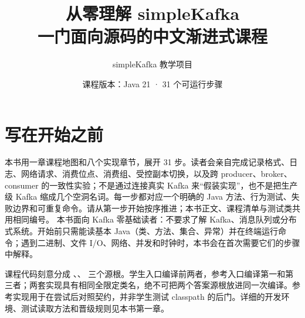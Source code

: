 \title{从零理解 simpleKafka\\\large 一门面向源码的中文渐进式课程}
\author{simpleKafka 教学项目}
\date{课程版本：Java 21 · 31 个可运行步骤}
\hypersetup{pageanchor=false}
\maketitle
\hypersetup{pageanchor=true}
\chapter*{写在开始之前}
本书用一章课程地图和八个实现章节，展开 31 步。读者会亲自完成记录格式、日志、网络请求、消费位点、消费组、受控副本切换，以及跨 producer、broker、consumer 的一致性实验；不是通过连接真实 Kafka 来“假装实现”，也不是把生产级 Kafka 缩成几个空洞名词。每一步都对应一个明确的 Java 方法、行为测试、失败边界和可重复命令。请从第一步开始按序推进；本书正文、课程清单与测试类共用相同编号。
本书面向 Kafka 零基础读者：不要求了解 Kafka、消息队列或分布式系统。开始前只需能读基本 Java（类、方法、集合、异常）并在终端运行命令；遇到二进制、文件 I/O、网络、并发和时钟时，本书会在首次需要它们的步骤中解释。

课程代码刻意分成 、、 三个源根。学生入口编译前两者，参考入口编译第一和第三者；两套实现具有相同全限定类名，绝不可把两个答案源根放进同一次编译。参考实现用于在尝试后对照契约，并非学生测试 classpath 的后门。详细的开发环境、测试读取方法和晋级规则见本书第一章。
\tableofcontents
